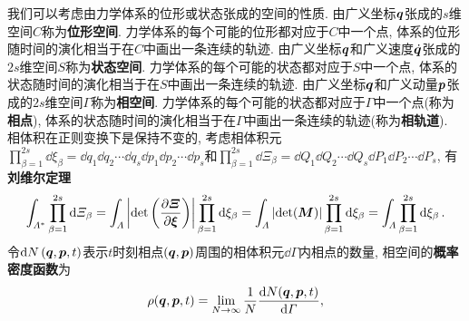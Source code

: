 我们可以考虑由力学体系的位形或状态张成的空间的性质. 由广义坐标$ \vb*{q} $张成的$ s $维空间$ C $称为\textbf{位形空间}. 力学体系的每个可能的位形都对应于$ C $中一个点, 体系的位形随时间的演化相当于在$ C $中画出一条连续的轨迹. 由广义坐标$ \vb*{q} $和广义速度$ \dot{\vb*{q}} $张成的$ 2s $维空间$ S $称为\textbf{状态空间}. 力学体系的每个可能的状态都对应于$ S $中一个点, 体系的状态随时间的演化相当于在$ S $中画出一条连续的轨迹. 由广义坐标$ \vb*{q} $和广义动量$ \vb*{p} $张成的$ 2s $维空间$ \varGamma $称为\textbf{相空间}. 力学体系的每个可能的状态都对应于$ \varGamma $中一个点(称为\textbf{相点}), 体系的状态随时间的演化相当于在$ \varGamma $中画出一条连续的轨迹(称为\textbf{相轨道}). 相体积在正则变换下是保持不变的, 考虑相体积元$ \prod_{\beta=1}^{2s} \dd{\xi_{\beta}}=\dd{q_1}\dd{q_2}\cdots\dd{q_s}\dd{p_1}\dd{p_2}\cdots\dd{p_s} $和$ \prod_{\beta=1}^{2s} \dd{\varXi_{\beta}}=\dd{Q_1}\dd{Q_2}\cdots\dd{Q_s}\dd{P_1}\dd{P_2}\cdots\dd{P_s} $, 有\textbf{刘维尔定理}
\begin{equation*}
    \int_{\varLambda^*} \prod_{\beta=1}^{2s} \dd{\varXi_{\beta}} = \int_{\varLambda} \abs{\det\bigg(\pdv{\vb*{\varXi}}{\vb*{\xi}}\bigg)} \prod_{\beta=1}^{2s} \dd{\xi_{\beta}} = \int_{\varLambda} \abs{\det(\vb*{M})} \prod_{\beta=1}^{2s} \dd{\xi_{\beta}} = \int_{\varLambda} \prod_{\beta=1}^{2s} \dd{\xi_{\beta}}.
\end{equation*}
令$ \dd{N}(\vb*{q},\vb*{p},t) $表示$ t $时刻相点$ (\vb*{q},\vb*{p}) $周围的相体积元$ \dd{\varGamma} $内相点的数量, 相空间的\textbf{概率密度函数}为
\begin{equation}
    \rho(\vb*{q},\vb*{p},t) = \lim_{N \to \infty} \frac{1}{N}\dv{N(\vb*{q},\vb*{p},t)}{\varGamma},
\end{equation}
